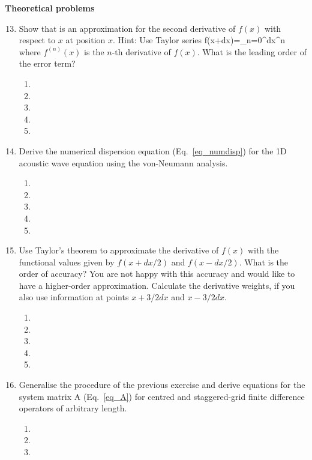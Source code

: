 {\bf Theoretical problems}
\begin{enumerate}
\setcounter{enumi}{12}
\item
Show that 
\be
{} 
\nonumber
\ee
is an approximation for the second derivative of $f(x)$ with respect to $x$ at position $x$. Hint: Use Taylor series 
\be
f(x+dx)=\sum_{n=0}^\infty {}dx^{n}  
\nonumber
\ee
where $f^{(n)}(x)$ is the $n$-th derivative of $f(x)$.
What is the leading order of the error term?
\begin{enumerate}
\item[]
\item[]
\item[] 
\item[]
\item[] 
\end{enumerate}
\item
Derive the numerical dispersion equation (Eq.~\ref{eq_numdisp}) for the 1D acoustic wave equation using the von-Neumann analysis.
\begin{enumerate}
\item[]
\item[]
\item[] 
\item[]
\item[] 
\end{enumerate}
\item
Use Taylor's theorem to approximate  the derivative of $f(x)$ with the functional values given by $f(x+dx/2)$ and $f(x-dx/2)$. What is the order of accuracy? You are not happy with this accuracy and would like to have a higher-order approximation. Calculate the derivative weights, if you also use information at points $x+3/2 dx$ and $x-3/2 dx$.  
\begin{enumerate}
\item[]
\item[]
\item[] 
\item[]
\item[] 
\end{enumerate}
\item
Generalise the procedure of the previous exercise and derive equations for the system matrix A (Eq.~\ref{eq_A}) for centred and staggered-grid  finite difference operators of arbitrary length.  
\begin{enumerate}
\item[]
\item[]
\item[] 

\end{enumerate}
\end{enumerate}
